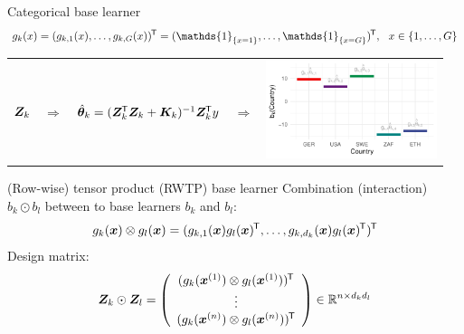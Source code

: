 \documentclass[t,10pt]{beamer}
\newcommand{\penMat}{\bm{K}}
\begin{document}
\begin{frame}{Categorical base learner}
  \vspace{-0.3cm}\[g_k(x) = (g_{k,1}(x), \dots, g_{k,G}(x))^\tran = (\mathds{1}_{\{x = 1\}}, \dots, \mathds{1}_{\{x = G\}})^\tran, \ \ x\in\{1, \dots, G\}\]
\begin{center}
    \begin{tabular}{ccccc}
         $\design_k$ & $\Rightarrow$ & $\tbh_k = (\design_k^\tran \design_k + \penMat_k)^{-1}\design_k^\tran y$ & $\Rightarrow$ & \includegraphics[align=c,width=5cm]{figures/bcat-estimated.pdf}
    \end{tabular}
\end{center}
\end{frame}





\begin{frame}{(Row-wise) tensor product (RWTP) base learner}
  Combination (interaction) $b_k \odot b_l$ between to base learners $b_k$ and $b_l$:
  \[g_k(\xv) \otimes g_l(\xv) = (g_{k,1}(\xv)g_l(\xv)^\tran, \dots, g_{k,d_k}(\xv)g_l(\xv)^\tran)^\tran \]
  Design matrix:
  \[
  \design_k \odot \design_l = \left(\begin{array}{c}
    (g_{k}(\xi[1]) \otimes g_l(\xi[1]))^\tran \\
    \vdots \\
    (g_{k}(\xi[n]) \otimes g_l(\xi[n]))^\tran
  \end{array}\right) \in\R^{n\times d_k d_l}
  \]
\end{frame}
\end{document}
